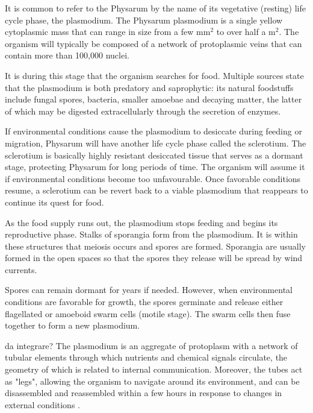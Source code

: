 It is common to refer to the Physarum by the name of its vegetative (resting) life cycle phase, the plasmodium. The Physarum plasmodium is a single yellow cytoplasmic mass that can range in size from a few mm$^2$ to over half a m$^2$. The organism will typically be composed of a network of protoplasmic veins that can contain more than 100,000 nuclei.
\par
It is during this stage that the organism searches for food. Multiple sources state that the plasmodium is both predatory and saprophytic: its natural foodstuffs include fungal spores, bacteria, smaller amoebae and decaying matter, the latter of which may be digested extracellularly through the secretion of enzymes.
\par
If environmental conditions cause the plasmodium to desiccate during feeding or migration, Physarum will have another life cycle phase called the sclerotium. The sclerotium is basically highly resistant desiccated tissue that serves as a dormant stage, protecting Physarum for long periods of time. The organism will assume it if environmental conditions become too
unfavourable. Once favorable conditions resume, a sclerotium can be revert back to a viable plasmodium that reappears to continue its quest for food.
\par
As the food supply runs out, the plasmodium stops feeding and begins its reproductive phase. Stalks of sporangia form from the plasmodium. It is within these structures that meiosis occurs and spores are formed. Sporangia are usually formed in the open spaces so that the spores they release will be spread by wind currents.
\par
Spores can remain dormant for years if needed. However, when environmental conditions are favorable for growth, the spores germinate and release either flagellated or amoeboid swarm cells (motile stage). The swarm cells then fuse together to form a new plasmodium. 

\par
da integrare? The plasmodium is an aggregate of protoplasm with a network of tubular elements through which nutrients and chemical signals circulate, the geometry of which is related to internal communication. Moreover, the tubes act as "legs", allowing the organism to navigate around its environment, and can be disassembled and reassembled within a few hours in response to changes in external conditions \cite{nakagaki2004obtaining}.



